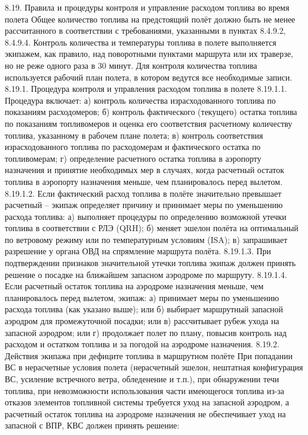 8.19.	Правила и процедуры контроля и управление расходом топлива во время полета
Общее количество топлива на предстоящий полёт должно быть не менее рассчитанного в соответствии с требованиями, указанными в пунктах 8.4.9.2, 8.4.9.4.
Контроль количества и температуры топлива в полете выполняется экипажем, как правило, над поворотными пунктами маршрута или их траверзе, но не реже одного раза в 30 минут. Для контроля количества топлива используется рабочий план полета, в котором ведутся все необходимые записи.
8.19.1.	Процедура контроля и управления расходом топлива в полете 
8.19.1.1. Процедура включает:
а)	контроль количества израсходованного топлива по показаниям расходомеров;
б)	контроль фактического (текущего) остатка топлива по показаниям топливомеров и оценка его соответствия расчетному количеству топлива, указанному в рабочем плане полета;
в)	контроль соответствия израсходованного топлива по расходомерам и фактического остатка по топливомерам;
г)	определение расчетного остатка топлива в аэропорту назначения и принятие необходимых мер в случаях, когда расчетный остаток топлива в аэропорту назначения меньше, чем планировалось перед вылетом.
8.19.1.2. Если фактический расход топлива в полёте значительно превышает расчетный – экипаж определяет причину и принимает меры по уменьшению расхода топлива:
а)	выполняет процедуры по определению возможной утечки топлива в соответствии с РЛЭ (QRH);
б)	меняет эшелон полёта на оптимальный по ветровому режиму или по температурным условиям (ISA);
в)	запрашивает разрешение у органа ОВД на спрямление маршрута полёта.
8.19.1.3. При подтверждении признаков значительной утечки топлива экипаж должен принять решение о посадке на ближайшем запасном аэродроме по маршруту.
8.19.1.4. Если расчетный остаток топлива на аэродроме назначения меньше, чем планировалось перед вылетом, экипаж:
а)	принимает меры по уменьшению расхода топлива (как указано выше); или
б)	выбирает маршрутный запасной аэродром для промежуточной посадки; или
в)	рассчитывает рубеж ухода на запасной аэродром; или
г)	продолжает полет по плану, повысив контроль над расходом и остатком топлива и за погодой на аэродроме назначения.
8.19.2.	Действия экипажа при дефиците топлива в маршрутном полёте
При попадании ВС в нерасчетные условия полета (нерасчетный эшелон, нештатная конфигурация ВС, усиление встречного ветра, обледенение и т.п.), при обнаружении течи топлива, при невозможности использования части имеющегося топлива из-за отказов элементов топливной системы требуется уход на запасной аэродром, а расчетный остаток топлива на аэродроме назначения не обеспечивает уход на запасной с ВПР, КВС должен принять решение:
